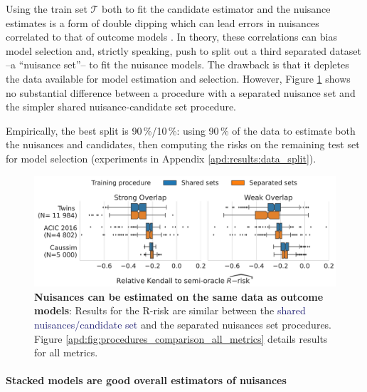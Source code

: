 \documentclass[a4paper,num-refs]{oup-contemporary}%
\begin{document}
Using the train set $\mathcal{T}$ both to fit the candidate estimator and the
nuisance estimates is a form of double dipping which can lead errors in
nuisances correlated to that of outcome models
\cite{nie_quasioracle_2017}. In theory, these correlations can bias model
selection and, strictly speaking, push
to split out a third separated dataset --a ``nuisance set''-- to fit the
nuisance models. The drawback is that it depletes the data available for
model estimation and selection. However, Figure
\ref{fig:procedures_comparison} shows no substantial difference between a procedure with a separated
nuisance set and the simpler shared nuisance-candidate set procedure.

Empirically, the best split is 90\,\%/10\,\%:
using 90\,\% of the data
to estimate both the nuisances and candidates, then computing the risks on the
remaining test set for model selection (experiments in Appendix
\ref{apd:results:data_split}).

\begin{figure}[!tb]
    \centering\begin{minipage}{\linewidth}
        \includegraphics[width=\linewidth]{_3_procedure_r_risk_only_3datasets_twocols.pdf}
    \end{minipage}

    \caption{\textbf{Nuisances can be estimated on the same data as outcome
            models}: Results for the R-risk are similar between the
        \textcolor{MidnightBlue}{shared
            nuisances/candidate set} and
        the \textcolor{RedOrange}{separated nuisances set} procedures. Figure
        \ref{apd:fig:procedures_comparison_all_metrics} details results for all metrics.}\label{fig:procedures_comparison}
\end{figure}

\paragraph{Stacked models are good overall estimators of nuisances}
\end{document}
